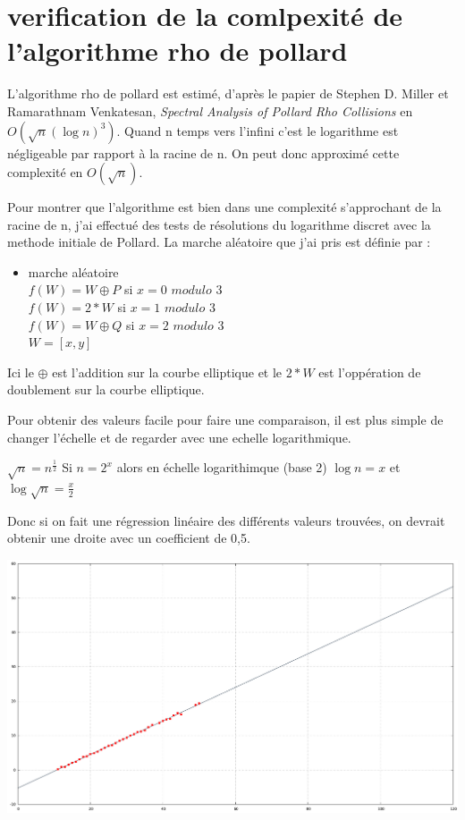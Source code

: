 \documentclass[a4paper,10pt]{report}
\begin{document}
\chapter{verification de la comlpexité de l'algorithme rho de pollard}

L'algorithme rho de pollard est estimé, d'après le papier de Stephen D. Miller et Ramarathnam Venkatesan, \textit{Spectral Analysis of Pollard Rho Collisions} en $O(\sqrt{n}(\log{n})^3)$. 
Quand n temps vers l'infini c'est le logarithme est négligeable par rapport à la racine de n. On peut donc approximé cette complexité en $O(\sqrt{n})$.

Pour montrer que l'algorithme est bien dans une complexité s'approchant de la racine de n, j'ai effectué des tests de résolutions du logarithme discret avec la methode initiale
de Pollard. La marche aléatoire que j'ai pris est définie par : \\
\begin{itemize}
 \item {marche aléatoire}\\
  $ f(W) = W \oplus P$ si $x = 0$ $modulo$ $3$ \\
  $ f(W) = 2*W$ si $x = 1$ $modulo$ $3$ \\
  $ f(W) = W \oplus Q$ si $x = 2$  $modulo$ $3$ \\
  $ W = [x,y] $ \\
\end{itemize}

Ici le $\oplus$ est l'addition sur la courbe elliptique et le $2*W$ est l'oppération de doublement sur la courbe elliptique.

Pour obtenir des valeurs facile pour faire une comparaison, il est plus simple de changer l'échelle et de regarder avec une echelle logarithmique.\\
\begin{center}
 $\sqrt{n} = n^{\frac{1}{2}}$
 Si $n=2^x$ alors en échelle logarithimque (base 2) $\log{n} = x$ et $\log{\sqrt{n}} = \frac{x}{2}$
\end{center}

Donc si on fait une régression linéaire des différents valeurs trouvées, on devrait obtenir une droite avec un coefficient de 0,5.

\begin{center}
 \includegraphics[width = 15cm]{regresion_rho_normal_bon.png}
\end{center}
\end{document}
